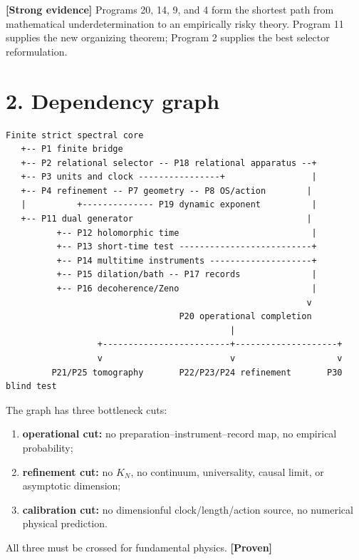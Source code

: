 \documentclass[11pt,a4paper,openany]{report}
\newcommand{\statusProven}{\textcolor{fingreen}{[Proven]}}
\newcommand{\statusStrong}{\textcolor{finblue}{[Strong evidence]}}
\begin{document}
\textbf{\statusStrong{}} Programs 20, 14, 9, and 4 form the shortest path from mathematical underdetermination to an empirically risky theory. Program 11 supplies the new organizing theorem; Program 2 supplies the best selector reformulation.

\section{2. Dependency graph}

\begin{Verbatim}[fontsize=\small]
Finite strict spectral core
   +-- P1 finite bridge
   +-- P2 relational selector -- P18 relational apparatus --+
   +-- P3 units and clock ----------------+                 |
   +-- P4 refinement -- P7 geometry -- P8 OS/action        |
   |          +-------------- P19 dynamic exponent          |
   +-- P11 dual generator                                  |
          +-- P12 holomorphic time                          |
          +-- P13 short-time test --------------------------+
          +-- P14 multitime instruments --------------------+
          +-- P15 dilation/bath -- P17 records              |
          +-- P16 decoherence/Zeno                          |
                                                           v
                                  P20 operational completion
                                            |
                  +-------------------------+--------------------+
                  v                         v                    v
         P21/P25 tomography       P22/P23/P24 refinement       P30 blind test
\end{Verbatim}

The graph has three bottleneck cuts:

\begin{enumerate}
\item 
\textbf{operational cut:} no preparation–instrument–record map, no empirical probability;

\item 
\textbf{refinement cut:} no \(K_N\), no continuum, universality, causal limit, or asymptotic dimension;

\item 
\textbf{calibration cut:} no dimensionful clock/\allowbreak{}length/\allowbreak{}action source, no numerical physical prediction.

\end{enumerate}

All three must be crossed for fundamental physics. \textbf{\statusProven{}}
\end{document}

